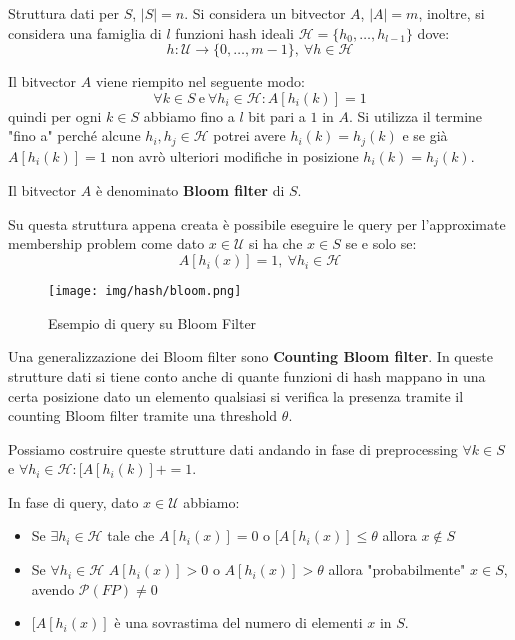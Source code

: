 Struttura dati per $S$, $|S| = n$. Si considera un bitvector $A$, $|A| = m$,
inoltre, si considera una famiglia di $l$ funzioni hash ideali $\mathcal{H} = \{h_0, \dots, h_{l - 1}\}$ dove:
\begin{equation}
    h: \mathcal{U} \to \{0, \dots, m - 1\}, \ \forall h \in \mathcal{H}
\end{equation}

Il bitvector $A$ viene riempito nel seguente modo:
\begin{equation}
    \forall k \in S \ \text{e} \ \forall h_i \in \mathcal{H}: A[h_i(k)] = 1
\end{equation}
quindi per ogni $k \in S$ abbiamo fino a $l$ bit pari a $1$ in $A$. Si utilizza
il termine "fino a" perché alcune $h_i, h_j \in \mathcal{H}$ potrei avere
$h_i(k) = h_j(k)$ e se già $A[h_i(k)] = 1$ non avrò ulteriori modifiche in
posizione $h_i(k) = h_j(k)$.

Il bitvector $A$ è denominato \textbf{Bloom filter} di $S$.

Su questa struttura appena creata è possibile eseguire le query per l'approximate
membership problem come dato $x \in \mathcal{U}$ si ha che $x \in S$ se e solo se:
\begin{equation}
    A[h_i(x)] = 1, \ \forall h_i \in \mathcal{H}
\end{equation}
\begin{figure}[!ht]
    \centering
    \texttt{[image: img/hash/bloom.png]}
    \caption{Esempio di query su Bloom Filter}
\end{figure}
\newpage
Una generalizzazione dei Bloom filter sono \textbf{Counting Bloom filter}. In
queste strutture dati si tiene conto anche di quante funzioni di hash mappano in
una certa posizione dato un elemento qualsiasi si verifica la presenza tramite
il counting Bloom filter tramite una threshold $\theta$.

Possiamo costruire queste strutture dati andando in fase di preprocessing
$\forall k \in S$ e $\forall h_i \in \mathcal{H}: [A[h_i(k)] += 1$.

In fase di query, dato $x \in \mathcal{U}$ abbiamo:
\begin{itemize}
    \item Se $\exists h_i \in \mathcal{H}$ tale che $A[h_i(x)] = 0$ o
          $[A[h_i(x)] \leq \theta$ allora $x \notin S$
    \item Se $\forall h_i \in \mathcal{H}$ $A[h_i(x)] > 0$ o $A[h_i(x)] > \theta$
          allora "probabilmente" $x \in S$, avendo $\mathcal{P}(FP) \neq 0$
    \item $[A[h_i(x)]$ è una sovrastima del numero di elementi $x$ in $S$.
\end{itemize}
